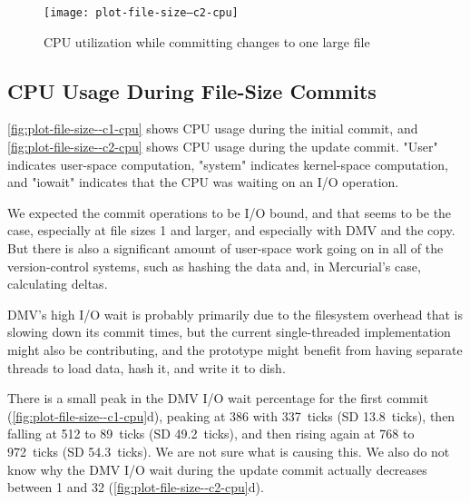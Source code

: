 \begin{figure}[p]
    \caption{CPU utilization while committing changes to one large file}
    \label{fig:plot-file-size--c2-cpu}
    \centering
    \texttt{[image: plot-file-size--c2-cpu]}
\end{figure}

\cleardoublepage

\subsection{CPU Usage During File-Size Commits}

\autoref{fig:plot-file-size--c1-cpu} shows CPU usage during the initial
\gls{commit}, and \autoref{fig:plot-file-size--c2-cpu} shows CPU usage during
the update commit. "User" indicates user-space computation, "system" indicates
kernel-space computation, and "iowait" indicates that the CPU was waiting on an
I/O operation.

We expected the commit operations to be I/O bound, and that seems to be the
case, especially at file sizes \SI{1}{\gib} and larger, and especially with DMV
and the copy. But there is also a significant amount of user-space work going on
in all of the version-control systems, such as hashing the data and, in
Mercurial's case, calculating deltas.

DMV's high I/O wait is probably primarily due to the filesystem overhead that is
slowing down its commit times, but the current single-threaded implementation
might also be contributing, and the prototype might benefit from having separate
threads to load data, hash it, and write it to dish.

There is a small peak in the DMV I/O wait percentage for the first commit
(\autoref{fig:plot-file-size--c1-cpu}d), peaking at \SI{386}{\mib} with
\SI{337}{ticks} (SD \SI{13.8}{ticks}), then falling at \SI{512}{\mib} to
\SI{89}{ticks} (SD \SI{49.2}{ticks}), and then rising again at \SI{768}{\mib} to
\SI{972}{ticks} (SD \SI{54.3}{ticks}). We are not sure what is causing this. We
also do not know why the DMV I/O wait during the update commit actually
decreases between \SI{1}{\gib} and \SI{32}{\gib}
(\autoref{fig:plot-file-size--c2-cpu}d).


